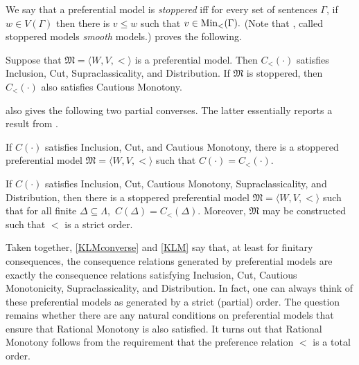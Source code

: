 We say that a preferential model is {\em stoppered} iff for every set of
sentences $\Gamma$, if $w\in V(\Gamma)$ then there is $v\leq w$ such that $v\in
\text{Min}_<(\Gamma).$ (Note that \citealp{kraus1990nonmonotonic}, called stoppered
models {\em smooth} models.) \citet{makinson1994general} proves the following.
\begin{theorem}\label{KLMconverse}
Suppose that $\mathfrak{M}=\langle W,V, < \rangle$ is a preferential model. Then
$C_<(\cdot)$ satisfies Inclusion, Cut, Supraclassicality, and Distribution. If
$\mathfrak{M}$ is stoppered, then $C_<(\cdot)$ also satisfies Cautious Monotony.
\end{theorem}
\citet{makinson1994general} also gives the following two partial converses. The
latter essentially reports a result from \citet{kraus1990nonmonotonic}.
\begin{theorem}
If $C(\cdot)$ satisfies Inclusion, Cut, and Cautious Monotony, there is a
stoppered preferential model $\mathfrak{M} = \langle W,V,< \rangle$ such that
$C(\cdot) = C_<(\cdot)$.
\end{theorem}
\begin{theorem}
  \label{KLM}
If $C(\cdot)$ satisfies Inclusion, Cut, Cautious Monotony, Supraclassicality,
and Distribution, then there is a stoppered preferential model
$\mathfrak{M}=\langle W,V,< \rangle$ such that for all finite $\Delta \subseteq
\Lambda,$ $C(\Delta)=C_<(\Delta).$ Moreover, $\mathfrak{M}$ may be constructed
such that $<$ is a strict order. 
\end{theorem}
Taken together, \autoref{KLMconverse} and \autoref{KLM} say that, at least for
finitary consequences, the consequence relations generated by preferential
models are exactly the consequence relations satisfying Inclusion, Cut, Cautious
Monotonicity, Supraclassicality, and Distribution. In fact, one can always think
of these preferential models as generated by a strict (partial) order. The
question remains whether there are any natural conditions on preferential models
that ensure that Rational Monotony is also satisfied. It turns out that Rational
Monotony follows from the requirement that the preference relation $<$ is a
total order.

